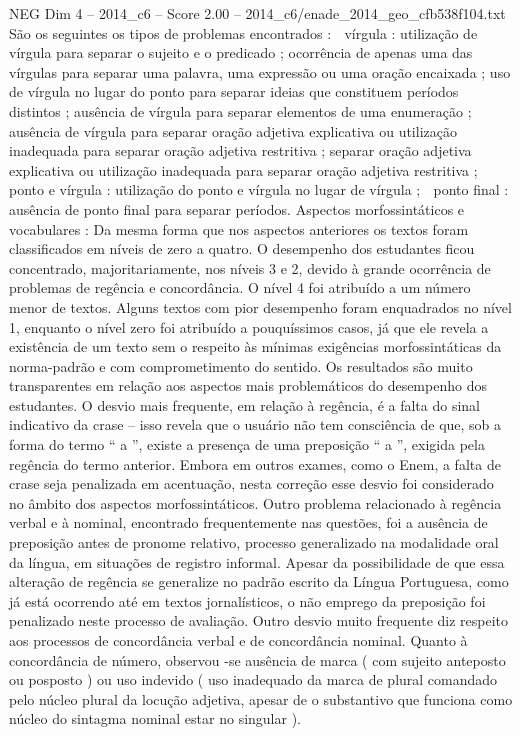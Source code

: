 \begin{textsample}{NEG Dim 4 – 2014\_c6 – Score 2.00 – 2014\_c6/enade\_2014\_geo\_cfb538f104.txt}
São os seguintes os tipos de problemas encontrados :  vírgula : utilização de vírgula para separar o sujeito e o predicado ; ocorrência de apenas uma das vírgulas para separar uma palavra, uma expressão ou uma oração encaixada ; uso de vírgula no lugar do ponto para separar ideias que constituem períodos distintos ; ausência de vírgula para separar elementos de uma enumeração ; ausência de vírgula para separar oração adjetiva explicativa ou utilização inadequada para separar oração adjetiva restritiva ; separar oração adjetiva explicativa ou utilização inadequada para separar oração adjetiva restritiva ;  ponto e vírgula : utilização do ponto e vírgula no lugar de vírgula ;  ponto final : ausência de ponto final para separar períodos.
Aspectos morfossintáticos e vocabulares : Da mesma forma que nos aspectos anteriores os textos foram classificados em níveis de zero a quatro.
O desempenho dos estudantes ficou concentrado, majoritariamente, nos níveis 3 e 2, devido à grande ocorrência de problemas de regência e concordância.
O nível 4 foi atribuído a um número menor de textos.
Alguns textos com pior desempenho foram enquadrados no nível 1, enquanto o nível zero foi atribuído a pouquíssimos casos, já que ele revela a existência de um texto sem o respeito às mínimas exigências morfossintáticas da norma-padrão e com comprometimento do sentido.
Os resultados são muito transparentes em relação aos aspectos mais problemáticos do desempenho dos estudantes.
O desvio mais frequente, em relação à regência, é a falta do sinal indicativo da crase – isso revela que o usuário não tem consciência de que, sob a forma do termo “ a ”, existe a presença de uma preposição “ a ”, exigida pela regência do termo anterior.
Embora em outros exames, como o Enem, a falta de crase seja penalizada em acentuação, nesta correção esse desvio foi considerado no âmbito dos aspectos morfossintáticos.
Outro problema relacionado à regência verbal e à nominal, encontrado frequentemente nas questões, foi a ausência de preposição antes de pronome relativo, processo generalizado na modalidade oral da língua, em situações de registro informal.
Apesar da possibilidade de que essa alteração de regência se generalize no padrão escrito da Língua Portuguesa, como já está ocorrendo até em textos jornalísticos, o não emprego da preposição foi penalizado neste processo de avaliação.
Outro desvio muito frequente diz respeito aos processos de concordância verbal e de concordância nominal.
Quanto à concordância de número, observou -se ausência de marca ( com sujeito anteposto ou posposto ) ou uso indevido ( uso inadequado da marca de plural comandado pelo núcleo plural da locução adjetiva, apesar de o substantivo que funciona como núcleo do sintagma nominal estar no singular ).

\end{textsample}
